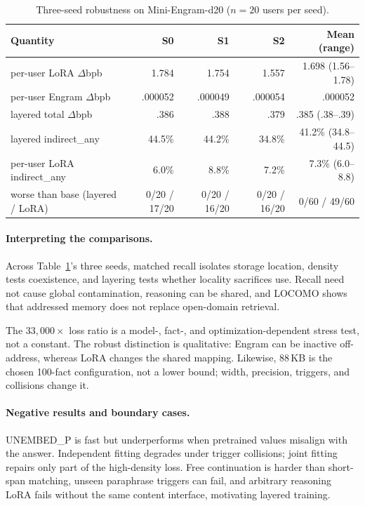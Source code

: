\documentclass[letterpaper]{article} %
\begin{document}
\begin{table}[t]
  \centering
  \small
  \begin{tabular}{lrrrr}
    \toprule
    Quantity & S0 & S1 & S2 & Mean (range) \\
    \midrule
    per-user LoRA $\Delta$bpb & 1.784 & 1.754 & 1.557 & 1.698 (1.56--1.78) \\
    per-user Engram $\Delta$bpb & .000052 & .000049 & .000054 & .000052 \\
    layered total $\Delta$bpb & .386 & .388 & .379 & .385 (.38--.39) \\
    layered indirect\_any & 44.5\% & 44.2\% & 34.8\% & 41.2\% (34.8--44.5) \\
    per-user LoRA indirect\_any & 6.0\% & 8.8\% & 7.2\% & 7.3\% (6.0--8.8) \\
    worse than base (layered / LoRA) & 0/20 / 17/20 & 0/20 / 16/20 & 0/20 / 16/20 & 0/60 / 49/60 \\
    \bottomrule
  \end{tabular}
  \caption{Three-seed robustness on Mini-Engram-d20 ($n=20$ users per seed).}
  \label{tab:seed-robustness}
\end{table}

\paragraph{Interpreting the comparisons.}
Across Table~\ref{tab:seed-robustness}'s three seeds, matched recall isolates
storage location, density tests coexistence, and layering tests whether
locality sacrifices use. Recall need not cause global contamination, reasoning
can be shared, and LOCOMO shows that addressed memory does not replace
open-domain retrieval.

The $33{,}000\times$ loss ratio is a model-, fact-, and optimization-dependent
stress test, not a constant. The robust distinction is qualitative: Engram can
be inactive off-address, whereas LoRA changes the shared mapping. Likewise,
88\,KB is the chosen 100-fact configuration, not a lower bound; width,
precision, triggers, and collisions change it.

\paragraph{Negative results and boundary cases.}
UNEMBED\_P is fast but underperforms when pretrained values misalign with the
answer. Independent fitting degrades under trigger collisions; joint fitting
repairs only part of the high-density loss. Free continuation is harder than
short-span matching, unseen paraphrase triggers can fail, and arbitrary
reasoning LoRA fails without the same content interface, motivating layered
training.
\end{document}
